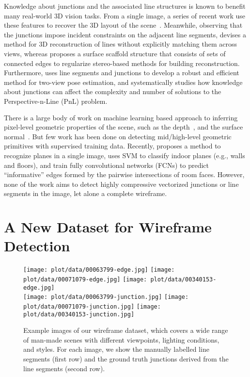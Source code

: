 \documentclass[10pt,twocolumn,letterpaper]{article}
\begin{document}
 Knowledge about junctions and the associated line structures is known to benefit many real-world 3D vision tasks. From a single image, a series of recent work use these features to recover the 3D layout of the scene~\cite{LeeHK09, RamalingamPJT13, RamalingamB13, Yang16}. Meanwhile, observing that the junctions impose incident constraints on the adjacent line segments, \cite{JainKTS10} devises a method for 3D reconstruction of lines without explicitly matching them across views, whereas \cite{WangFSZLCTQ16} proposes a surface scaffold structure that consists of sets of connected edges to regularize stereo-based methods for building reconstruction. Furthermore, \cite{ElqurshE11} uses line segments and junctions to develop a robust and efficient method for two-view pose estimation, and \cite{Xu2017} systematically studies how knowledge about junctions can affect the complexity and number of solutions to the Perspective-n-Line (PnL) problem.

 There is a large body of work on machine learning based approach to inferring pixel-level geometric properties of the scene, such as the depth~\cite{SaxenaCN08, EigenPF14}, and the surface normal~\cite{FouheyGH13, FouheyGH14}. But few work has been done on detecting mid/high-level geometric primitives with supervised training data. Recently, \cite{HainesC15} proposes a method to recognize planes in a single image, \cite{GuoZH15} uses SVM to classify indoor planes (e.g., walls and floors), and \cite{MallyaL15, RenCLK16a, DasguptaFCS16} train fully convolutional networks (FCNs) to predict ``informative'' edges formed by the pairwise intersections of room faces. However, none of the work aims to detect highly compressive vectorized junctions or line segments in the image, let alone a complete wireframe.
 \section{A New Dataset for Wireframe Detection}

\begin{figure}[t]
\centering
\texttt{[image: plot/data/00063799-edge.jpg]}
\texttt{[image: plot/data/00071079-edge.jpg]}
\texttt{[image: plot/data/00340153-edge.jpg]}\\
\vspace{0.5mm}\texttt{[image: plot/data/00063799-junction.jpg]}
\texttt{[image: plot/data/00071079-junction.jpg]}
\texttt{[image: plot/data/00340153-junction.jpg]}
\caption{Example images of our wireframe dataset, which covers a wide range of man-made scenes with different viewpoints, lighting conditions, and styles. For each image, we show the manually labelled line segments (first row) and the ground truth junctions derived from the line segments (second row).\vspace{-4mm}}
\label{fig:data}
\end{figure}
\end{document}
